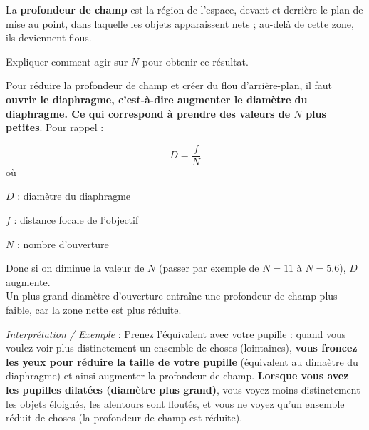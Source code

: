 \documentclass[answers]{exam}
\begin{document}
\begin{questions}
\begin{questions}
  \begin{solution}
  La \textbf{profondeur de champ} est la région de l’espace, devant et derrière le plan de mise au point, dans laquelle les objets apparaissent nets ; au-delà de cette zone, ils deviennent flous.  
  \end{solution}

\question[C.3.2] Expliquer comment agir sur $N$ pour obtenir ce résultat.

  \begin{solution}
  Pour réduire la profondeur de champ et créer du flou d’arrière-plan, il faut \textbf{ouvrir le diaphragme, c'est-à-dire augmenter le diamètre du diaphragme. Ce qui correspond à prendre des valeurs de $N$ plus petites}. Pour rappel :
  
  \[
  D = \frac{f}{N}
  \]
  où 
  \begin{addmargin}[4em]{1em}
  \begin{compactitem}
    \item[$D$] : diamètre du diaphragme
    \item[$f$] : distance focale de l’objectif
    \item[$N$] : nombre d’ouverture
  \end{compactitem}
  \end{addmargin}

  \vspace{1em}

  Donc si on diminue la valeur de $N$ (passer par exemple de $N=11$ à $N=5.6$), $D$ augmente. \\
  Un plus grand diamètre d'ouverture entraîne une profondeur de champ plus faible, car la zone nette est plus réduite.

  \vspace{1em}

  \textit{Interprétation / Exemple} : Prenez l'équivalent avec votre pupille : quand vous voulez voir plus distinctement un ensemble de choses (lointaines), \textbf{vous froncez les yeux pour réduire la taille de votre pupille} (équivalent au dimaètre du diaphragme) et ainsi augmenter la profondeur de champ.
  \textbf{Lorsque vous avez les pupilles dilatées (diamètre plus grand)}, vous voyez moins distinctement les objets éloignés, les alentours sont floutés, et vous ne voyez qu'un ensemble réduit de choses (la profondeur de champ est réduite).
  
\end{solution}

\end{questions}



\end{questions}
\end{document}
